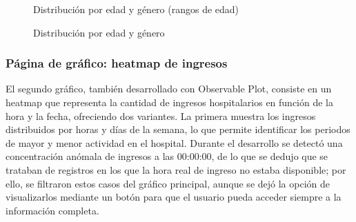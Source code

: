 \begin{figure}[H]
  \centering
  \caption{Distribución por edad y género (rangos de edad)}
  \label{fig:chart2}
\end{figure}

\begin{figure}[H]
  \centering
  \caption{Distribución por edad y género}
  \label{fig:chart3}
\end{figure}


\subsubsection{Página de gráfico: heatmap de ingresos}

El segundo gráfico, también desarrollado con Observable Plot, consiste en un heatmap\cite{heatmap} que representa la cantidad de ingresos hospitalarios en función de la hora y la fecha, ofreciendo dos variantes. La primera muestra los ingresos distribuidos por horas y días de la semana, lo que permite identificar los periodos de mayor y menor actividad en el hospital. Durante el desarrollo se detectó una concentración anómala de ingresos a las 00:00:00, de lo que se dedujo que se trataban de registros en los que la hora real de ingreso no estaba disponible; por ello, se filtraron estos casos del gráfico principal, aunque se dejó la opción de visualizarlos mediante un botón para que el usuario pueda acceder siempre a la información completa.

